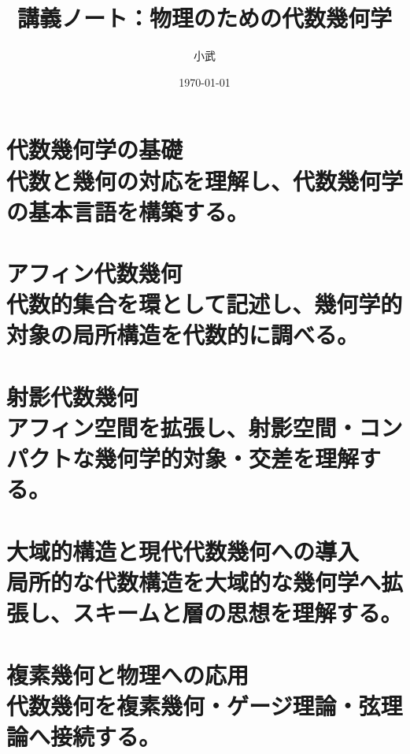 \documentclass[uplatex, dvipdfmx, book, 11pt]{jsbook}
\title{講義ノート：物理のための代数幾何学}
\author{小武}
\date{\today}
\numberwithin{equation}{section}
\begin{document}
\frontmatter
\maketitle
\tableofcontents

\mainmatter

\part[代数幾何学の基礎]{代数幾何学の基礎\\[2em]
\normalsize\normalfont 代数と幾何の対応を理解し、代数幾何学の基本言語を構築する。}





\part[アフィン代数幾何]{アフィン代数幾何\\[2em]
\normalsize\normalfont 代数的集合を環として記述し、幾何学的対象の局所構造を代数的に調べる。}




\part[射影代数幾何]{射影代数幾何\\[2em]
\normalsize\normalfont アフィン空間を拡張し、射影空間・コンパクトな幾何学的対象・交差を理解する。}



\part[大域的構造と現代代数幾何への導入]{大域的構造と現代代数幾何への導入\\[2em]
\normalsize\normalfont 局所的な代数構造を大域的な幾何学へ拡張し、スキームと層の思想を理解する。}




\part[複素幾何と物理への応用]{複素幾何と物理への応用\\[2em]
\normalsize\normalfont 代数幾何を複素幾何・ゲージ理論・弦理論へ接続する。}





\end{document}
